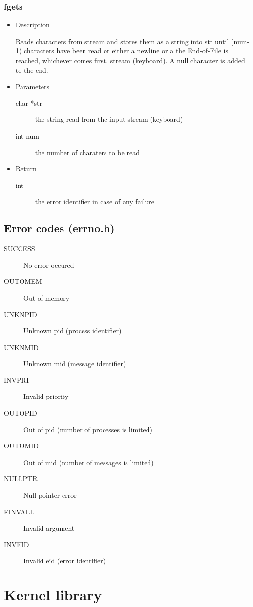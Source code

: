 \subsubsection{fgets}
\begin{itemize}
  \item{Description}

	 Reads characters from stream and stores them as a string into str until (num-1)
	 characters have been read or either a newline or a the End-of-File is reached,
	 whichever comes first. stream (keyboard). A null character is added to the end.
  \item{Parameters}
	 \begin{description}
		\item[char *str]  the string read from the input stream (keyboard)
		\item[int num]  the number of charaters to be read
	 \end{description}
  \item{Return}
	 \begin{description}
		\item[int] the error identifier in case of any failure
	 \end{description}
\end{itemize}

\subsection{Error codes (errno.h)}
\begin{description}
  \item[SUCCESS] No error occured
  \item[OUTOMEM] Out of memory
  \item[UNKNPID] Unknown pid (process identifier)
  \item[UNKNMID] Unknown mid (message identifier)
  \item[INVPRI] Invalid priority
  \item[OUTOPID] Out of pid (number of processes is limited) 
  \item[OUTOMID] Out of mid (number of messages is limited) 
  \item[NULLPTR] Null pointer error
  \item[EINVALL] Invalid argument
  \item[INVEID] Invalid eid (error identifier)
\end{description}


\section{Kernel library}
